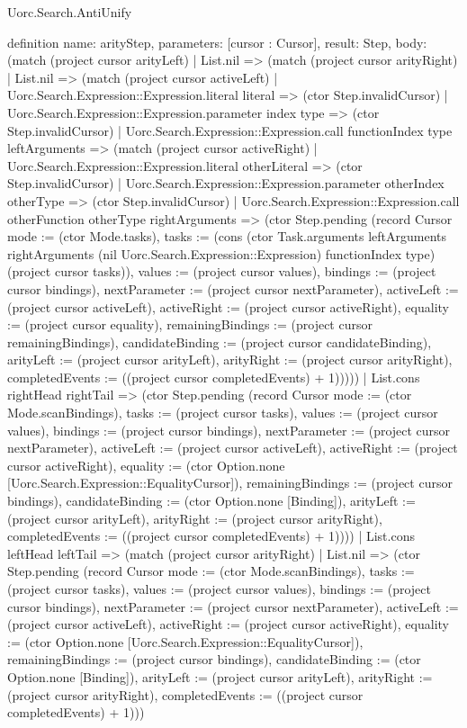 \begin{lexlean}{Uorc.Search.AntiUnify}
\begin{semanticmodule}
definition{
  name: arityStep,
  parameters: [cursor : Cursor],
  result: Step,
  body: (match (project cursor arityLeft)
    | List.nil => (match (project cursor arityRight)
      | List.nil => (match (project cursor activeLeft)
        | Uorc.Search.Expression::Expression.literal literal => (ctor Step.invalidCursor)
        | Uorc.Search.Expression::Expression.parameter index type => (ctor Step.invalidCursor)
        | Uorc.Search.Expression::Expression.call functionIndex type leftArguments => (match (project cursor activeRight)
          | Uorc.Search.Expression::Expression.literal otherLiteral => (ctor Step.invalidCursor)
          | Uorc.Search.Expression::Expression.parameter otherIndex otherType => (ctor Step.invalidCursor)
          | Uorc.Search.Expression::Expression.call otherFunction otherType rightArguments => (ctor Step.pending (record Cursor {mode := (ctor Mode.tasks), tasks := (cons (ctor Task.arguments leftArguments rightArguments (nil Uorc.Search.Expression::Expression) functionIndex type) (project cursor tasks)), values := (project cursor values), bindings := (project cursor bindings), nextParameter := (project cursor nextParameter), activeLeft := (project cursor activeLeft), activeRight := (project cursor activeRight), equality := (project cursor equality), remainingBindings := (project cursor remainingBindings), candidateBinding := (project cursor candidateBinding), arityLeft := (project cursor arityLeft), arityRight := (project cursor arityRight), completedEvents := ((project cursor completedEvents) + 1)}))))
      | List.cons rightHead rightTail => (ctor Step.pending (record Cursor {mode := (ctor Mode.scanBindings), tasks := (project cursor tasks), values := (project cursor values), bindings := (project cursor bindings), nextParameter := (project cursor nextParameter), activeLeft := (project cursor activeLeft), activeRight := (project cursor activeRight), equality := (ctor Option.none [Uorc.Search.Expression::EqualityCursor]), remainingBindings := (project cursor bindings), candidateBinding := (ctor Option.none [Binding]), arityLeft := (project cursor arityLeft), arityRight := (project cursor arityRight), completedEvents := ((project cursor completedEvents) + 1)})))
    | List.cons leftHead leftTail => (match (project cursor arityRight)
      | List.nil => (ctor Step.pending (record Cursor {mode := (ctor Mode.scanBindings), tasks := (project cursor tasks), values := (project cursor values), bindings := (project cursor bindings), nextParameter := (project cursor nextParameter), activeLeft := (project cursor activeLeft), activeRight := (project cursor activeRight), equality := (ctor Option.none [Uorc.Search.Expression::EqualityCursor]), remainingBindings := (project cursor bindings), candidateBinding := (ctor Option.none [Binding]), arityLeft := (project cursor arityLeft), arityRight := (project cursor arityRight), completedEvents := ((project cursor completedEvents) + 1)}))
}
\end{semanticmodule}
\end{lexlean}
